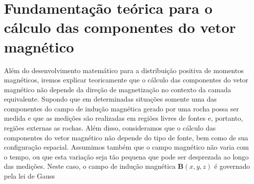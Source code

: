 
\section{Fundamentação teórica para o cálculo das componentes do vetor magnético}

Além do desenvolvimento matemático para a distribuição positiva de momentos magnéticos, iremos explicar teoricamente que o cálculo das componentes do vetor magnético não depende da direção de magnetização no contexto da camada equivalente. Supondo que em determinadas situações somente uma das componentes do campo de indução magnética gerado por uma rocha possa ser medida e que as medições são realizadas em regiões livres de fontes e, portanto, regiões externas as rochas. Além disso, consideramos que o cálculo das componentes do vetor magnético não depende do tipo de fonte, bem como de sua configuração espacial. Assumimos também que o campo magnético não varia com o tempo, ou que esta variação seja tão pequena que pode ser desprezada ao longo das medições. Neste caso, o campo de indução magnética $\mathbf{B}(x,y,z)$ é governado pela lei de Gauss

